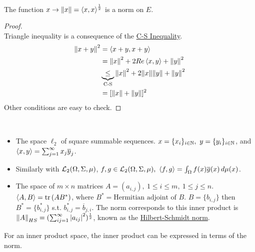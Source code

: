 \vspace{3pt}
\begin{corollary}\ \\
The function $x \to \norm{x} = \left\langle x, x \right\rangle^{\frac{1}{2}}$ is a norm on $E$.
\end{corollary}
\begin{proof}\ \\
Triangle inequality is a consequence of the \underline{C-S Inequality}. 
\begin{align*}
    \norm{x + y}^2 &= \left\langle x+y, x+y \right\rangle\\ &= \norm{x}^2 + 2 Re\left\langle x, y \right\rangle + \norm{y}^2\\ &\underbrace{\leq}_{\text{C-S}} \norm{x}^2 + 2 \norm{x} \norm{y} + \norm{y}^2\\ &= [\norm{x} + \norm{y}]^2
\end{align*}
Other conditions are easy to check.
\end{proof}

\begin{examples}\ 
\begin{itemize}
    \item The space $\ell_2$ of square summable sequences. $x = \{x_i\}_{i \in \mathbb{N}},\ y = \{y_i\}_{i \in \mathbb{N}}$, and $\left\langle x, y \right\rangle = \sum_{j = 1}^\infty x_j \overline{y}_j$.
    \item Similarly with $\mathcal{L}_2(\Omega,\Sigma,\mu)$, $f,g \in \mathcal{L}_2(\Omega, \Sigma, \mu),\ \left\langle f, g \right\rangle = \int_\Omega f(x )\overline{g}(x) \,d\mu(x)$.
    \item The space of $m \times n$ matrices $A = (a_{i,j}),\ 1 \leq i \leq m,\ 1 \leq j \leq n$. $\inprod{A}{B} = \trace{(A B^*)}$, where $B^* = \text{Hermitian adjoint of } B$. $B = \{b_{i,j}\}$ then $B^* = \{b_{i,j}^*\}$ s.t. $b_{i,j}^* = \overline{b}_{j,i}$. The norm corresponds to this inner product is $\norm{A}_{HS} = (\sum_{ij = 1}^\infty \abs{a_{ij}}^2)^{\frac{1}{2}}$, known as the \underline{Hilbert-Schmidt norm}.
\end{itemize}
\end{examples}

\np For an inner product space, the inner product can be expressed in terms of the norm.



